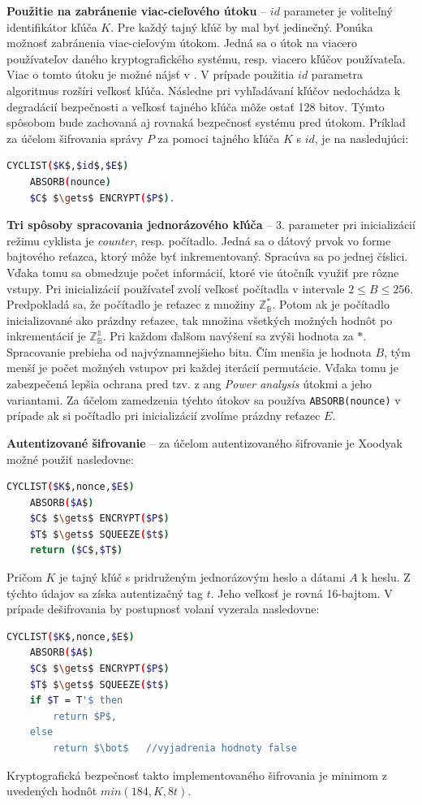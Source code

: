 \textbf{Použitie na zabránenie viac-cieľového útoku} -- $id$ parameter je voliteľný identifikátor kľúča $K$. Pre každý tajný kľúč by mal byť jedinečný. Ponúka možnosť zabránenia viac-cieľovým útokom. Jedná sa o útok na viacero používateľov daného kryptografického systému, resp. viacero kľúčov používateľa. Viac o tomto útoku je možné nájsť v \cite{mta}. V prípade použitia $id$ parametra algoritmus rozšíri veľkosť kľúča. Následne pri vyhľadávaní kľúčov nedochádza k degradácií bezpečnosti a veľkosť tajného kľúča môže ostať 128 bitov. Týmto spôsobom bude zachovaná aj rovnaká bezpečnosť systému pred útokom. 
Príklad za účelom šifrovania správy $P$ za pomoci tajného kľúča $K$ s $id$, je na nasledujúci:
\begin{lstlisting}[language=bash, mathescape=true]
	CYCLIST($K$,$id$,$E$)
	ABSORB(nounce)
	$C$ $\gets$ ENCRYPT($P$).
\end{lstlisting}
\textbf{Tri spôsoby spracovania jednorázového kľúča} -- 3. parameter pri inicializácií režimu cyklista je \textit{counter}, resp. počítadlo. Jedná sa o dátový prvok vo forme bajtového reťazca, ktorý môže byť inkrementovaný. Spracúva sa po jednej číslici. Vďaka tomu sa obmedzuje počet informácií, ktoré vie útočník využiť pre rôzne vstupy. Pri inicializácií používateľ zvolí veľkosť počítadla v intervale $2 \leq B \leq 256$. Predpokladá sa, že počítadlo je reťazec z množiny $\mathbb{Z^*_B}$. Potom ak je počítadlo inicializované ako prázdny reťazec, tak množina všetkých možných hodnôt po inkrementácií je $\mathbb{Z^1_B}$. Pri každom ďalšom navýšení sa zvýši hodnota za $*$. Spracovanie prebieha od najvýznamnejšieho bitu. Čím menšia je hodnota $B$, tým menší je počet možných vstupov pri každej iterácií permutácie. Vďaka tomu je zabezpečená lepšia ochrana pred tzv. z ang \textit{Power analysis} \cite{paa} útokmi a jeho variantami. Za účelom zamedzenia týchto útokov sa používa \lstinline|ABSORB(nounce)| v prípade ak si počítadlo pri inicializácií zvolíme prázdny reťazec $E$. 

\textbf{Autentizované šifrovanie} -- za účelom autentizovaného šifrovanie je Xoodyak možné použiť nasledovne:
\begin{lstlisting}[language=bash,mathescape=true]
	CYCLIST($K$,nonce,$E$)
	ABSORB($A$)
	$C$ $\gets$ ENCRYPT($P$)
	$T$ $\gets$ SQUEEZE($t$)
	return ($C$,$T$)
\end{lstlisting}
Pričom $K$ je tajný kľúč s pridruženým jednorázovým heslo a dátami $A$ k heslu. Z týchto údajov sa získa autentizačný tag $t$. Jeho veľkosť je rovná 16-bajtom. V prípade dešifrovania by postupnosť volaní vyzerala nasledovne:   
\begin{lstlisting}[language=bash,mathescape=true]
	CYCLIST($K$,nonce,$E$)
	ABSORB($A$)
	$C$ $\gets$ ENCRYPT($P$)
	$T$ $\gets$ SQUEEZE($t$)
	if $T = T'$ then 
		return $P$, 
	else 
		return $\bot$ 	//vyjadrenia hodnoty false 
\end{lstlisting}
Kryptografická bezpečnosť takto implementovaného šifrovania je minimom z uvedených hodnôt $min(184,K,8t)$.

